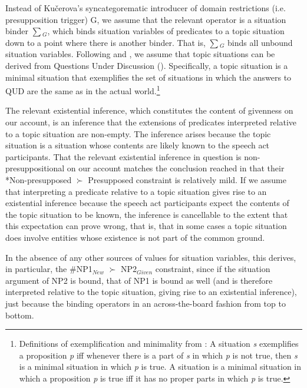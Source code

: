 \documentclass[output=paper,modfonts,nonflat]{langsci/langscibook}
\begin{document}
Instead of Ku\v{c}erova's syncategorematic introducer of domain restrictions (i.e. presupposition trigger) G, we assume that the relevant operator is a situation binder $\sum$$_{G}$, which binds situation variables of predicates to a topic situation down to a point where there is another binder. That is, $\sum$$_{G}$ binds all unbound situation variables. Following \citet{Kratzer:2017} and \citet[127--133]{Schwarz:2009}, we assume that topic situations can be derived from Questions Under Discussion (\citet{Roberts:1996,Buring:2003}). Specifically, a topic situation is a minimal situation that exemplifies the set of situations in which the answers to QUD are the same as in the actual world.\footnote{Definitions of exemplification and minimality from \citet{Kratzer:2017}: A situation {\itshape s} exemplifies a proposition {\itshape p} iff whenever there is a part of {\itshape s} in which {\itshape p} is not true, then {\itshape s} is a minimal situation in which {\itshape p} is true.  A situation is a minimal situation in which a proposition {\itshape p} is true iff  it has no proper parts in which {\itshape p} is true.}

The relevant existential inference, which constitutes the content of givenness on our account, is an inference that the extensions of predicates interpreted relative to a topic situation are non-empty. The inference arises because the topic situation is a situation whose contents are likely known to the speech act participants. That the relevant existential inference in question is non-presuppositional on our account matches the conclusion reached in \citet{SimikWierzba:2015} that their *Non-presupposed $\succ$ Presupposed constraint is relatively mild. If we assume that interpreting a predicate relative to a topic situation gives rise to an existential inference because the speech act participants expect the contents of the topic situation to be known, the inference is cancellable to the extent that this expectation can prove wrong, that is, that in some cases a topic situation does involve entities whose existence is not part of the common ground.

In the absence of any other sources of values for situation variables, this derives, in particular, the \#NP1$_{New}$ $\succ$ NP2$_{Given}$ constraint, since if the situation argument of NP2 is bound, that of NP1 is bound as well (and is therefore interpreted relative to the topic situation, giving rise to an existential inference), just because the binding operators in an across-the-board fashion from top to bottom.
\end{document}
